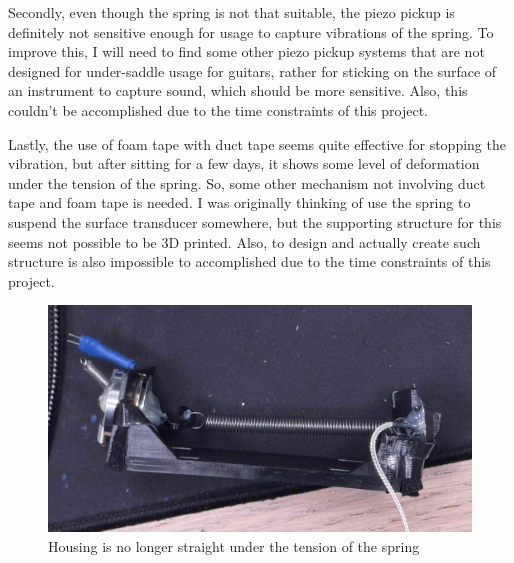 \documentclass[11pt,a4paper]{article}
\begin{document}
Secondly, even though the spring is not that suitable, the piezo pickup is definitely not sensitive enough for usage to capture vibrations of the spring. To improve this, I will need to find some other piezo pickup systems that are not designed for under-saddle usage for guitars, rather for sticking on the surface of an instrument to capture sound, which should be more sensitive. Also, this couldn't be accomplished due to the time constraints of this project. 

Lastly, the use of foam tape with duct tape seems quite effective for stopping the vibration, but after sitting for a few days, it shows some level of deformation under the tension of the spring. So, some other mechanism not involving duct tape and foam tape is needed. I was originally thinking of use the spring to suspend the surface transducer somewhere, but the supporting structure for this seems not possible to be 3D printed. Also, to design and actually create such structure is also impossible to accomplished due to the time constraints of this project.

\begin{figure}[h] 
	\center 
	\includegraphics[width=0.5\linewidth]{deformation.jpg} 
	\caption{Housing is no longer straight under the tension of the spring} 
\end{figure} 
\end{document}
